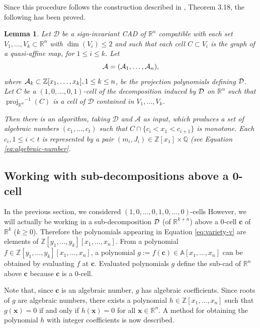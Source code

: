 \documentclass[
]{book}
\newtheorem{lemma}{Lemma}[chapter]
\theoremstyle{definition}
\theoremstyle{definition}
\theoremstyle{definition}
\theoremstyle{definition}
\theoremstyle{remark}
\begin{document}
Since this procedure follows the construction described in \citet{bgv15}, Theorem 3.18, the following has been proved.

\begin{lemma}
\protect\hypertarget{lem:monotone-sector-algorithm}{}\label{lem:monotone-sector-algorithm}Let \(\mathcal{D}\) be a sign-invariant CAD of \(\mathbb{R}^n\) compatible with each set \(V_1,\ldots,V_k \subset \mathbb{R}^n\) with \(\dim(V_i) \le 2\) and such that each cell \(C \subset V_i\) is the graph of a quasi-affine map, for \(1\le i \le k\). Let
\[
{\cal A} = ({\cal A}_1,\ldots,{\cal A}_n),
\]
where \({\cal A}_k \subset \mathbb{Z}[x_1,\ldots,x_k], 1 \le k \le n\), be the projection polynomials defining \(\cal D\).
Let \(C\) be a \((1,0,\ldots,0,1)\)-cell of the decomposition induced by \(\cal D\) on \(\mathbb{R}^{\alpha}\) such that \({\operatorname{proj}_{\mathbb{R}^{\alpha}}}^{-1}(C)\) is a cell of \(\mathcal{D}\) contained in \(V_1,\ldots,V_k\).

Then there is an algorithm, taking \(\mathcal{D}\) and \(\mathcal{A}\) as input, which produces a set of algebraic numbers \((c_1,\ldots,c_t)\) such that \(C \cap \{ c_i < x_1 < c_{i+1} \}\) is monotone. Each \(c_i, 1 \le i < t\) is represented by a pair \((m_i, J_i) \in \mathbb{Z}[x_1] \times \mathbb{Q}\) (see Equation \eqref{eq:algebraic-number}.
\end{lemma}

\hypertarget{sec:sub-cad}{%
\subsection{Working with sub-decompositions above a 0-cell}\label{sec:sub-cad}}

In the previous section, we considered \((1,0,\ldots,0,1,0,\ldots,0)\)-cells
However, we will actually be working in a sub-decomposition \(\cal D\) (of \(\mathbb{R}^{k+n}\)) above a \(0\)-cell \(\mathbf{c}\) of \(\mathbb{R}^k\) (\(k \ge 0\)). Therefore the polynomials appearing in Equation \eqref{eq:variety-v} are elements of \(\mathbb{Z}[y_1,\ldots,y_k][x_1,\ldots,x_n]\).
From a polynomial \(f \in \mathbb{Z}[y_1,\ldots,y_k][x_1,\ldots,x_n]\), a polynomial \(g := f(\mathbf{c}) \in \mathbb{A}[x_1,\ldots,x_n]\) can be obtained by evaluating \(f\) at \(\mathbf{c}\). Evaluated polynomials \(g\) define the sub-cad of \(\mathbb{R}^n\) above \(\mathbf{c}\) because \(\mathbf{c}\) is a \(0\)-cell.

Note that, since \(\mathbf{c}\) is an algebraic number, \(g\) has algebraic coefficients. Since roots of \(g\) are algebraic numbers, there exists a polynomial \(h \in \mathbb{Z}[x_1,\ldots,x_n]\) such that \(g(\mathbf{x}) = 0\) if and only if \(h(\mathbf{x}) = 0\) for all \(\mathbf{x} \in \mathbb{R}^n\). A method for obtaining the polynomial \(h\) with integer coefficients is now described.
\end{document}

